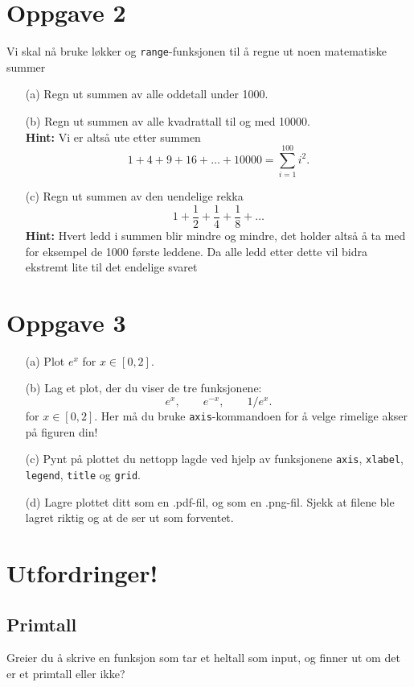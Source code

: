 \documentclass[a4paper, 11pt, notitlepage]{article}
\begin{document}
\section*{Oppgave 2}
Vi skal nå bruke løkker og \verb+range+-funksjonen til å regne ut noen matematiske summer
\begin{itemize}
    \item[(a)] Regn ut summen av alle oddetall under 1000.
    \item[(b)] Regn ut summen av alle kvadrattall til og med 10000. \\ \textbf{Hint:} Vi er altså ute etter summen
    $$1 + 4 + 9 + 16 + \ldots + 10000 = \sum_{i=1}^{100} i^2.$$
    \item[(c)] Regn ut summen av den uendelige rekka
    $$1 + \frac{1}{2} + \frac{1}{4} + \frac{1}{8} + \ldots$$
    \textbf{Hint:} Hvert ledd i summen blir mindre og mindre, det holder altså å ta med for eksempel de 1000 første leddene. Da alle ledd etter dette vil bidra ekstremt lite til det endelige svaret
\end{itemize}

\section*{Oppgave 3}
\begin{itemize}
    \item[(a)] Plot $e^x$ for $x\in[0,2]$.
    \item[(b)] Lag et plot, der du viser de tre funksjonene:
    $$e^x, \qquad e^{-x}, \qquad 1/e^{x}.$$
    for $x \in [0,2]$. Her må du bruke \verb+axis+-kommandoen for å velge rimelige akser på figuren din!
    \item[(c)] Pynt på plottet du nettopp lagde ved hjelp av funksjonene \verb+axis+, \verb+xlabel+, \verb+legend+, \verb+title+ og \verb+grid+.
    \item[(d)] Lagre plottet ditt som en .pdf-fil, og som en .png-fil. Sjekk at filene ble lagret riktig og at de ser ut som forventet.
\end{itemize}



\clearpage

\section*{Utfordringer!}
\subsection*{Primtall}
Greier du å skrive en funksjon som tar et heltall som input, og finner ut om det er et primtall eller ikke?
\end{document}
